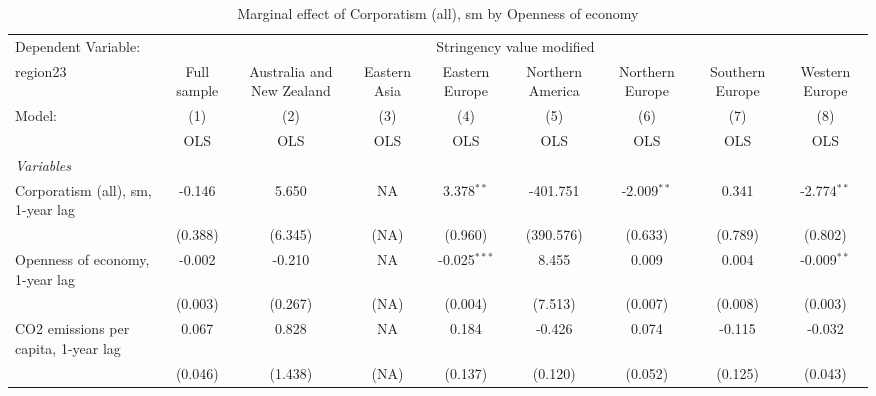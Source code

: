
\begin{table}[htbp]
   \caption{Marginal effect of Corporatism (all), sm by Openness of economy}
   \centering
   \begin{tabular}{lcccccccc}
      \toprule
      Dependent Variable: & \multicolumn{8}{c}{Stringency value modified}\\
      region23                                                            & Full sample   & Australia and New Zealand & Eastern Asia & Eastern Europe & Northern America & Northern Europe & Southern Europe & Western Europe \\   
      Model:                                                              & (1)           & (2)                       & (3)          & (4)            & (5)              & (6)             & (7)             & (8)\\  
                                                                          &  OLS          & OLS                       & OLS          & OLS            & OLS              & OLS             & OLS             & OLS\\  
      \midrule
      \emph{Variables}\\
      Corporatism (all), sm, 1-year lag                                   & -0.146        & 5.650                     & NA           & 3.378$^{**}$   & -401.751         & -2.009$^{**}$   & 0.341           & -2.774$^{**}$\\   
                                                                          & (0.388)       & (6.345)                   & (NA)         & (0.960)        & (390.576)        & (0.633)         & (0.789)         & (0.802)\\   
      Openness of economy, 1-year lag                                     & -0.002        & -0.210                    & NA           & -0.025$^{***}$ & 8.455            & 0.009           & 0.004           & -0.009$^{**}$\\   
                                                                          & (0.003)       & (0.267)                   & (NA)         & (0.004)        & (7.513)          & (0.007)         & (0.008)         & (0.003)\\   
      CO2 emissions per capita, 1-year lag                                & 0.067         & 0.828                     & NA           & 0.184          & -0.426           & 0.074           & -0.115          & -0.032\\   
                                                                          & (0.046)       & (1.438)                   & (NA)         & (0.137)        & (0.120)          & (0.052)         & (0.125)         & (0.043)\\   

\end{tabular}
\end{table}
